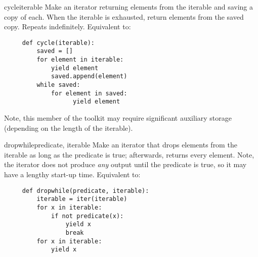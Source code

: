 \begin{funcdesc}{cycle}{iterable}
  Make an iterator returning elements from the iterable and saving a
  copy of each.  When the iterable is exhausted, return elements from
  the saved copy.  Repeats indefinitely.  Equivalent to:

  \begin{verbatim}
     def cycle(iterable):
         saved = []
         for element in iterable:
             yield element
             saved.append(element)
         while saved:
             for element in saved:
                   yield element
  \end{verbatim}

  Note, this member of the toolkit may require significant
  auxiliary storage (depending on the length of the iterable).
\end{funcdesc}

\begin{funcdesc}{dropwhile}{predicate, iterable}
  Make an iterator that drops elements from the iterable as long as
  the predicate is true; afterwards, returns every element.  Note,
  the iterator does not produce \emph{any} output until the predicate
  is true, so it may have a lengthy start-up time.  Equivalent to:

  \begin{verbatim}
     def dropwhile(predicate, iterable):
         iterable = iter(iterable)
         for x in iterable:
             if not predicate(x):
                 yield x
                 break
         for x in iterable:
             yield x
  \end{verbatim}
\end{funcdesc}

